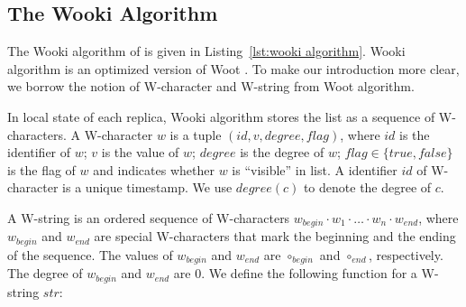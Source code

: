 






\subsection{The Wooki Algorithm}
\label{subsec:the Wooki algorithm}

The Wooki algorithm of \cite{DBLP:conf/wise/WeissUM07} is given in Listing~\ref{lst:wooki algorithm}. %
Wooki algorithm is an optimized version of Woot \cite{DBLP:conf/cscw/OsterUMI06}. To make our introduction more clear, we borrow the notion of W-character and W-string from Woot algorithm.

In local state of each replica, Wooki algorithm stores the list as a sequence of W-characters. A W-character $w$ is a tuple $(id,v,degree,flag)$, where $id$ is the identifier of $w$; $v$ is the value of $w$; $degree$ is the degree of $w$; $flag \in \{ \mathit{true},\mathit{false} \}$ is the flag of $w$ and indicates whether $w$ is ``visible'' in list. A identifier $id$ of W-character is a unique timestamp. %
We use $degree(c)$ to denote the degree of $c$.

A W-string is an ordered sequence of W-characters $w_{begin} \cdot w_1 \cdot \ldots \cdot w_n \cdot w_{end}$, where $w_{begin}$ and $w_{end}$ are special W-characters that mark the beginning and the ending of the sequence. The values of $w_{begin}$ and $w_{end}$ are $\circ_{begin}$ and $\circ_{end}$, respectively. The degree of $w_{begin}$ and $w_{end}$ are $0$. We define the following function for a W-string $str$:

